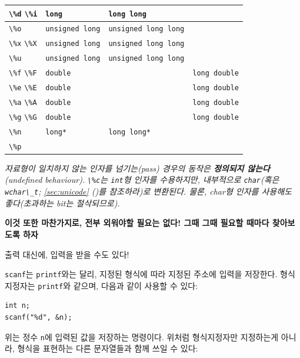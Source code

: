\documentclass[a4paper,12pt]{book}
\newcommand{\V}[1]{\Verb|#1|}
\newcommand*{\fullref}[1]{\autoref{#1} (\nameref*{#1})}
\begin{document}
\begin{longtable}{ || m{5em} || m{7.5em} | m{10em} | m{7.5em} || }
        \hline \V{\%d} \V{\%i} & \V{long}          & \V{long long}          &                      \\
        \hline \V{\%o}         & \V{unsigned long} & \V{unsigned long long} &                      \\
        \hline \V{\%x} \V{\%X} & \V{unsigned long} & \V{unsigned long long} &                      \\
        \hline \V{\%u}         & \V{unsigned long} & \V{unsigned long long} &                      \\
        \hline \V{\%f} \V{\%F} & \V{double}        &                        & \V{long double}      \\
        \hline \V{\%e} \V{\%E} & \V{double}        &                        & \V{long double}      \\
        \hline \V{\%a} \V{\%A} & \V{double}        &                        & \V{long double}      \\
        \hline \V{\%g} \V{\%G} & \V{double}        &                        & \V{long double}      \\
        \hline \V{\%n}         & \V{long*}         & \V{long long*}         &                      \\
        \hline \V{\%p}         &                   &                        &                      \\ 
        \hline
    \end{longtable}
    \textit{\color{gray} \small * 자료형이 일치하지 않는 인자를 넘기는(pass) 경우의 동작은
    \textbf{정의되지 않는다}(undefined behaviour).}
    \newline
    \textit{\color{gray} \small * \V{\%c}는 \V{int}형 인자를 수용하지만,
    내부적으로 \V{char}(혹은 \V{wchar\_t}; \fullref{sec:unicode}를 참조하라)로 변환된다.
    물론, char형 인자를 사용해도 좋다(초과하는 bit는 절삭되므로).}
\endgroup

\textbf{
    이것 또한 마찬가지로, 전부 외워야할 필요는 없다!
    그때 그때 필요할 때마다 찾아보도록 하자
}

출력 대신에, 입력을 받을 수도 있다!

\V{scanf}는 \V{printf}와는 달리, 지정된 형식에 따라 지정된 주소에 입력을 저장한다.
형식지정자는 \V{printf}와 같으며, 다음과 같이 사용할 수 있다:

\begin{lstlisting}
int n;
scanf("%d", &n);
\end{lstlisting}

위는 정수 \V{n}에 입력된 값을 저장하는 명령이다.
위처럼 형식지정자만 지정하는게 아니라,
형식을 표현하는 다른 문자열들과 함께 쓰일 수 있다:
\end{document}
